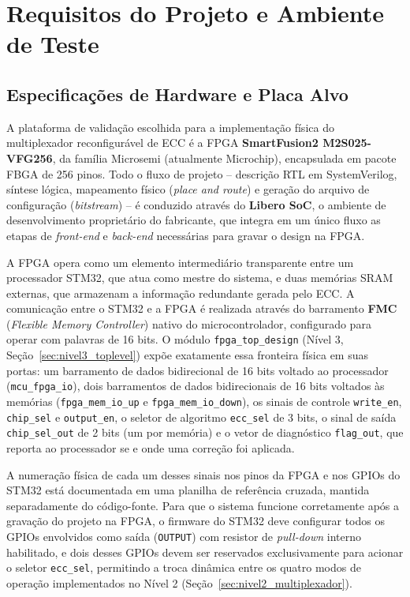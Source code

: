 \documentclass[12pt,a4paper]{article}
\begin{document}
\section{Requisitos do Projeto e Ambiente de Teste}
\label{sec:requisitos_teste}

\subsection{Especificações de Hardware e Placa Alvo}

A plataforma de validação escolhida para a implementação física do 
multiplexador reconfigurável de ECC é a FPGA \textbf{SmartFusion2 
M2S025-VFG256}, da família Microsemi (atualmente Microchip), encapsulada 
em pacote FBGA de 256 pinos. Todo o fluxo de projeto -- descrição RTL em 
SystemVerilog, síntese lógica, mapeamento físico (\textit{place and 
route}) e geração do arquivo de configuração (\textit{bitstream}) -- é 
conduzido através do \textbf{Libero SoC}, o ambiente de desenvolvimento 
proprietário do fabricante, que integra em um único fluxo as etapas de 
\textit{front-end} e \textit{back-end} necessárias para gravar o design 
na FPGA.

A FPGA opera como um elemento intermediário transparente entre um 
processador STM32, que atua como mestre do sistema, e duas memórias SRAM 
externas, que armazenam a informação redundante gerada pelo ECC. A 
comunicação entre o STM32 e a FPGA é realizada através do barramento 
\textbf{FMC} (\textit{Flexible Memory Controller}) nativo do 
microcontrolador, configurado para operar com palavras de 16 bits. O 
módulo \texttt{fpga\_top\_design} (Nível 3, Seção~\ref{sec:nivel3_toplevel}) 
expõe exatamente essa fronteira física em suas portas: um barramento de 
dados bidirecional de 16 bits voltado ao processador 
(\texttt{mcu\_fpga\_io}), dois barramentos de dados bidirecionais de 16 
bits voltados às memórias (\texttt{fpga\_mem\_io\_up} e 
\texttt{fpga\_mem\_io\_down}), os sinais de controle \texttt{write\_en}, 
\texttt{chip\_sel} e \texttt{output\_en}, o seletor de algoritmo 
\texttt{ecc\_sel} de 3 bits, o sinal de saída \texttt{chip\_sel\_out} de 2 
bits (um por memória) e o vetor de diagnóstico \texttt{flag\_out}, que 
reporta ao processador se e onde uma correção foi aplicada.

A numeração física de cada um desses sinais nos pinos da FPGA e nos GPIOs 
do STM32 está documentada em uma planilha de referência cruzada, mantida 
separadamente do código-fonte. Para que o sistema funcione corretamente 
após a gravação do projeto na FPGA, o firmware do STM32 deve configurar 
todos os GPIOs envolvidos como saída (\texttt{OUTPUT}) com resistor de 
\textit{pull-down} interno habilitado, e dois desses GPIOs devem ser 
reservados exclusivamente para acionar o seletor \texttt{ecc\_sel}, 
permitindo a troca dinâmica entre os quatro modos de operação implementados 
no Nível 2 (Seção~\ref{sec:nivel2_multiplexador}).
\end{document}
